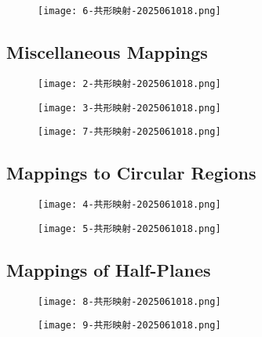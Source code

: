 \begin{figure}[H]
\centering
\texttt{[image: 6-共形映射-2025061018.png]}
\label{}
\end{figure}

\subsection{Miscellaneous Mappings}

\begin{figure}[H]
\centering
\texttt{[image: 2-共形映射-2025061018.png]}
\label{}
\end{figure}
\begin{figure}[H]
\centering
\texttt{[image: 3-共形映射-2025061018.png]}
\label{}
\end{figure}
\begin{figure}[H]
\centering
\texttt{[image: 7-共形映射-2025061018.png]}
\label{}
\end{figure}

\subsection{Mappings to Circular Regions}

\begin{figure}[H]
\centering
\texttt{[image: 4-共形映射-2025061018.png]}
\label{}
\end{figure}
\begin{figure}[H]
\centering
\texttt{[image: 5-共形映射-2025061018.png]}
\label{}
\end{figure}

\subsection{Mappings of Half-Planes}

\begin{figure}[H]
\centering
\texttt{[image: 8-共形映射-2025061018.png]}
\label{}
\end{figure}
\begin{figure}[H]
\centering
\texttt{[image: 9-共形映射-2025061018.png]}
\label{}
\end{figure}
